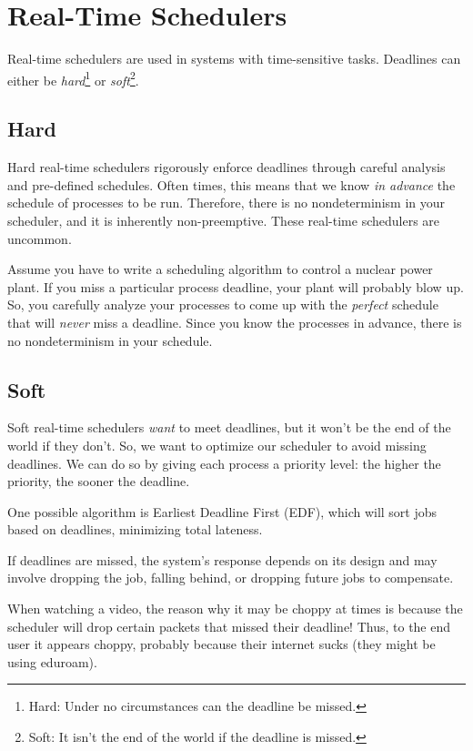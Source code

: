 \documentclass{report}
\newcommand{\exampleBegin}[1]{\begin{tcolorbox}[colback=blue!5!white,colframe=black!75!blue,title={Example:
      #1}]}
\newcommand{\exampleEnd}{\end{tcolorbox}}
\begin{document}
\section{Real-Time Schedulers}
Real-time schedulers are used in systems with time-sensitive tasks. Deadlines can either be
\textit{hard}\footnote{Hard: Under no circumstances can the deadline be missed.} or
\textit{soft}\footnote{Soft: It isn't the end of the world if the deadline is missed.}.


\subsection{Hard}
Hard real-time schedulers rigorously enforce deadlines through careful analysis and pre-defined
schedules. Often times, this means that we know \textit{in advance} the schedule of processes to be
run. Therefore, there is no nondeterminism in your scheduler, and it is inherently non-preemptive.
These real-time schedulers are uncommon. 

\exampleBegin{Deadly Deadline}
Assume you have to write a scheduling algorithm to control a nuclear power plant. If you miss a
particular process deadline, your plant will probably blow up. So, you carefully analyze your
processes to come up with the \textit{perfect} schedule that will \textit{never} miss a
deadline. Since you know the processes in advance, there is no nondeterminism in your
schedule.
\exampleEnd


\subsection{Soft}
Soft real-time schedulers \textit{want} to meet deadlines, but it won't be the end of the world if
they don't. So, we want to optimize our scheduler to avoid missing deadlines. We can do so by giving
each process a priority level: the higher the priority, the sooner the deadline.

One possible algorithm is Earliest Deadline First (EDF), which will sort jobs based on deadlines,
minimizing total lateness.

If deadlines are missed, the system's response depends on its design and may involve dropping the
job, falling behind, or dropping future jobs to compensate.

\exampleBegin{Choppy Video}
When watching a video, the reason why it may be choppy at times is because the scheduler will drop
certain packets that missed their deadline! Thus, to the end user it appears choppy, probably
because their internet sucks (they might be using eduroam).
\exampleEnd
\end{document}

